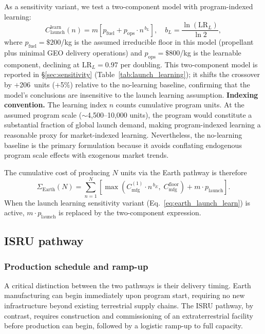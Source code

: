 \documentclass[preprint,12pt]{elsarticle}
\begin{document}
As a sensitivity variant, we test a two-component model with program-indexed learning:
\begin{equation}
  C_{\mathrm{launch}}^{\mathrm{learn}}(n) = m \left[ p_{\mathrm{fuel}} + p_{\mathrm{ops}} \cdot n^{\,b_L} \right], \quad b_L = \frac{\ln(\mathrm{LR}_L)}{\ln 2},
  \label{eq:earth_launch_learn}
\end{equation}
where $p_{\mathrm{fuel}} = \$200$/kg is the assumed irreducible floor in this model (propellant plus minimal GEO delivery operations) and $p_{\mathrm{ops}} = \$800$/kg is the learnable component, declining at $\mathrm{LR}_L = 0.97$ per doubling. This two-component model is reported in \S\ref{sec:sensitivity} (Table~\ref{tab:launch_learning}); it shifts the crossover by $+$206~units ($+$5\%) relative to the no-learning baseline, confirming that the model's conclusions are insensitive to the launch learning assumption. \textbf{Indexing convention.} The learning index $n$ counts cumulative program units. At the assumed program scale ($\sim$4{,}500--10{,}000 units), the program would constitute a substantial fraction of global launch demand, making program-indexed learning a reasonable proxy for market-indexed learning. Nevertheless, the no-learning baseline is the primary formulation because it avoids conflating endogenous program scale effects with exogenous market trends.

The cumulative cost of producing $N$ units via the Earth pathway is therefore
\begin{equation}
  \Sigma_{\mathrm{Earth}}(N) = \sum_{n=1}^{N} \left[ \max\!\left(C_{\mathrm{mfg}}^{(1)} \cdot n^{\,b_E},\; C_{\mathrm{mfg}}^{\mathrm{floor}}\right) + m \cdot p_{\mathrm{launch}} \right].
  \label{eq:earth_cum}
\end{equation}
When the launch learning sensitivity variant (Eq.~\ref{eq:earth_launch_learn}) is active, $m \cdot p_{\mathrm{launch}}$ is replaced by the two-component expression.

\subsection{ISRU pathway}

\subsubsection{Production schedule and ramp-up}

A critical distinction between the two pathways is their delivery timing. Earth manufacturing can begin immediately upon program start, requiring no new infrastructure beyond existing terrestrial supply chains. The ISRU pathway, by contrast, requires construction and commissioning of an extraterrestrial facility before production can begin, followed by a logistic ramp-up to full capacity.
\end{document}
